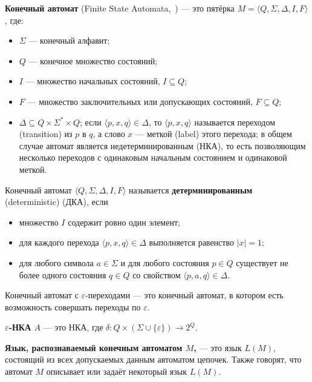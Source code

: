 \begin{mydef}
\textbf{Конечный автомат} (Finite State Automata,~\cite{FSA}) --- это пятёрка $M = \langle Q,\Sigma,\Delta,I,F \rangle$, где:
\begin{itemize}
    \item $\Sigma$ --- конечный алфавит;
    \item $Q$ --- конечное множество состояний;
    \item $I$ --- множество начальных состояний, $I \subseteq Q$;
    \item $F$ --- множество заключительных или допускающих состояний, $F \subseteq Q$;
    \item $\Delta \subseteq Q \times \Sigma ^ * \times Q$; если $\langle p, x, q \rangle \in \Delta$, то $\langle p, x, q \rangle$ называется переходом (transition) из $p$ в $q$, а слово $x$ --- меткой (label) этого перехода; в общем случае автомат является недетерминированным (НКА), то есть позволяющим несколько переходов с одинаковым начальным состоянием и одинаковой меткой.
\end{itemize}
\end{mydef}

\begin{mydef}
Конечный автомат $\langle Q , \Sigma , \Delta , I , F \rangle$ называется \textbf{детерминированным} (deterministic) (ДКА), если 
\begin{itemize}
    \item множество $I$ содержит ровно один элемент;
    \item для каждого перехода $\langle p , x , q \rangle \in \Delta$ выполняется равенство $|x| = 1$;
    \item для любого символа $a \in \Sigma$ и для любого состояния $p \in Q$ существует не более одного состояния $q \in Q$ со свойством $\langle p , a , q \rangle \in \Delta$.
\end{itemize}
\end{mydef}

\begin{mydef}
Конечный автомат с $\varepsilon$-переходами --- это конечный автомат, в котором есть возможность совершать переходы по $\varepsilon$.
\end{mydef}

\begin{mydef}
\textbf{$\varepsilon$-НКА $A$} --- это НКА, где  $\delta : Q\times (\Sigma\cup\{\varepsilon\}) \to 2^Q$.
\end{mydef}

\begin{mydef}
 \textbf{Язык, распознаваемый конечным автоматом $M$,} --- это язык $L(M)$, состоящий из всех допускаемых данным автоматом цепочек. Также говорят, что автомат $M$ описывает или задаёт некоторый язык $L(M)$.
\end{mydef}


